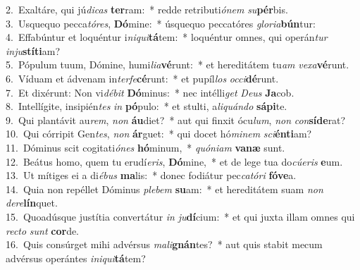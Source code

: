 {2.~}Exaltáre, qui jú\textit{di}\textit{cas} \textbf{ter}ram:~* redde retributi\textit{ó}\textit{nem} \textit{su}\textbf{pér}bis.\\
{3.~}Usquequo pecca\textit{tó}\textit{res}, \textbf{Dó}mine:~* úsquequo peccatóres \textit{glo}\textit{ri}\textit{a}\textbf{bún}tur:\\
{4.~}Effabúntur et loquéntur i\textit{ni}\textit{qui}\textbf{tá}tem:~* loquéntur omnes, qui operán\textit{tur} \textit{in}\textit{ju}\textbf{stí}\textbf{ti}am?\\
{5.~}Pópulum tuum, Dómine, humi\textit{li}\textit{a}\textbf{vé}runt:~* et hereditátem tu\textit{am} \textit{ve}\textit{xa}\textbf{vé}runt.\\
{6.~}Víduam et ádvenam in\textit{ter}\textit{fe}\textbf{cé}runt:~* et pupíl\textit{los} \textit{oc}\textit{ci}\textbf{dé}runt.\\
{7.~}Et dixérunt: Non vi\textit{dé}\textit{bit} \textbf{Dó}minus:~* nec intélli\textit{get} \textit{De}\textit{us} \textbf{Ja}cob.\\
{8.~}Intellígite, insipién\textit{tes} \textit{in} \textbf{pó}pulo:~* et stulti, a\textit{li}\textit{quán}\textit{do} \textbf{sá}\textbf{pi}te.\\
{9.~}Qui plantávit au\textit{rem}, \textit{non} \textbf{áu}diet?~* aut qui finxit ócu\textit{lum}, \textit{non} \textit{con}\textbf{sí}\textbf{de}rat?\\
{10.~}Qui córripit Gen\textit{tes}, \textit{non} \textbf{ár}guet:~* qui docet hó\textit{mi}\textit{nem} \textit{sci}\textbf{én}\textbf{ti}am?\\
{11.~}Dóminus scit cogitati\textit{ó}\textit{nes} \textbf{hó}minum,~* \textit{quó}\textit{ni}\textit{am} \textbf{va}\textbf{næ} sunt.\\
{12.~}Beátus homo, quem tu erudí\textit{e}\textit{ris}, \textbf{Dó}mine,~* et de lege tua do\textit{cú}\textit{e}\textit{ris} \textbf{e}um.\\
{13.~}Ut mítiges ei a di\textit{é}\textit{bus} \textbf{ma}lis:~* donec fodiátur pec\textit{ca}\textit{tó}\textit{ri} \textbf{fó}\textbf{ve}a.\\
{14.~}Quia non repéllet Dóminus \textit{ple}\textit{bem} \textbf{su}am:~* et hereditátem suam \textit{non} \textit{de}\textit{re}\textbf{lín}quet.\\
{15.~}Quoadúsque justítia convertátur \textit{in} \textit{ju}\textbf{dí}cium:~* et qui juxta illam omnes qui \textit{re}\textit{cto} \textit{sunt} \textbf{cor}de.\\
{16.~}Quis consúrget mihi advérsus \textit{ma}\textit{li}\textbf{gnán}tes?~* aut quis stabit mecum advérsus operántes \textit{i}\textit{ni}\textit{qui}\textbf{tá}tem?\\
